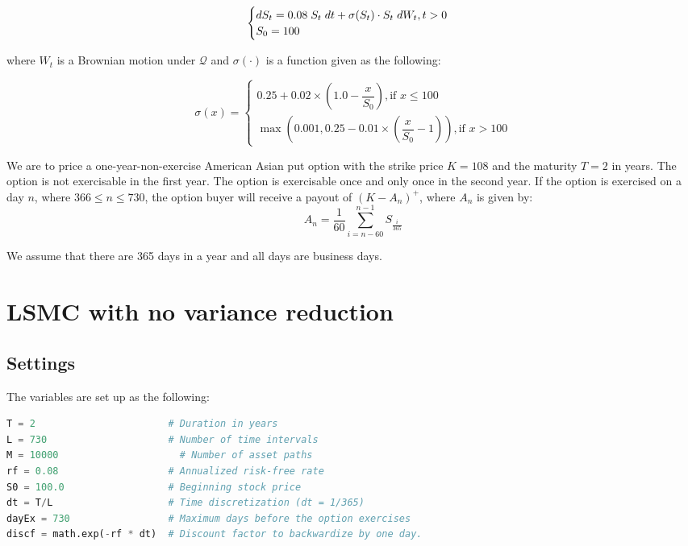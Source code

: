 \documentclass[12pt]{article}
\begin{document}
$$
\begin{cases}
dS_t = 0.08\hspace{1mm}S_t\hspace{1mm}dt + \sigma(S_t) \cdot S_t\hspace{1mm}dW_t, t > 0 \\
S_0 = 100
\end{cases}
$$

where $W_t$ is a Brownian motion under $\mathcal{Q}$ and $\sigma(\cdot)$ is a function given as the following:

$$
\sigma(x) = 
\begin{cases}
0.25+ 0.02 \times \left ( 1.0 - \dfrac{x}{S_0} \right), \text{if }x\leq 100 \\
\max\left(0.001, 0.25-0.01 \times\left(\dfrac{x}{S_0} - 1\right) \right), \text{if }x>100
\end{cases}
$$

We are to price a one-year-non-exercise American Asian put option with the strike price $K=108$ and the maturity $T=2$ in years. The option is not exercisable in the first year. The option is exercisable once and only once in the second year. If the option is exercised on a day $n$, where $366 \leq n \leq 730$, the option buyer will receive a payout of $(K-A_n)^+$, where $A_n$ is given by:
$$A_n = \dfrac{1}{60} \sum_{i=n-60}^{n-1} S_{\frac{i}{365}}$$

We assume that there are 365 days in a year and all days are business days.

\newpage
\section{LSMC with no variance reduction}

\subsection{Settings}

The variables are set up as the following:

\begin{lstlisting}[language=Python]
T = 2                       # Duration in years
L = 730                     # Number of time intervals
M = 10000                     # Number of asset paths
rf = 0.08                   # Annualized risk-free rate
S0 = 100.0                  # Beginning stock price
dt = T/L                    # Time discretization (dt = 1/365)
dayEx = 730                 # Maximum days before the option exercises
discf = math.exp(-rf * dt)  # Discount factor to backwardize by one day.
\end{lstlisting}
\end{document}
